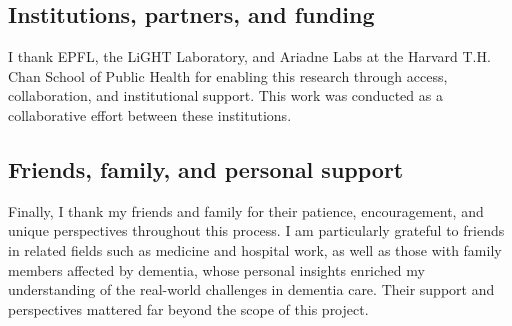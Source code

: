 \subsection*{Institutions, partners, and funding}

I thank EPFL, the LiGHT Laboratory, and Ariadne Labs at the Harvard T.H. Chan School of Public Health for enabling this research through access, collaboration, and institutional support. This work was conducted as a collaborative effort between these institutions.

\subsection*{Friends, family, and personal support}

Finally, I thank my friends and family for their patience, encouragement, and unique perspectives throughout this process. I am particularly grateful to friends in related fields such as medicine and hospital work, as well as those with family members affected by dementia, whose personal insights enriched my understanding of the real-world challenges in dementia care. Their support and perspectives mattered far beyond the scope of this project.

